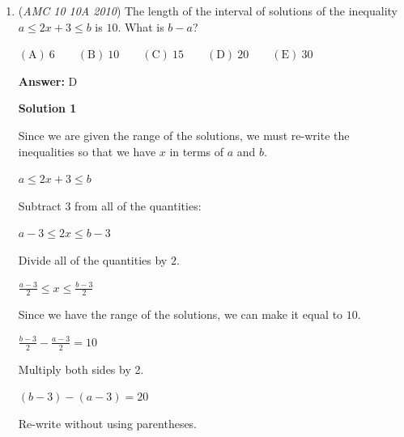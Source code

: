 \begin{enumerate}
 For example:

 $5/27/08$	Tue

 $5/27/09$	Wed

 $5/27/10$	Thur

 $5/27/11$	Fri

 However, 2012 is a leap year and has $366$ days, and $366 = 52 \cdot 7 + 2$ . This means we move "forward" \textbf{two} days in 2012, and skip past Saturday and straight to Sunday.

 Therefore:$5/27/11$	Fri

 $5/27/12$	Sun

 You can keep counting forward to find that the first time this date falls on a Saturday is in $2017$:

 $5/27/13$	Mon

 $5/27/14$	Tue

 $5/27/15$	Wed

 $5/27/16$	Fri

 $5/27/17$	Sat

 $\boxed{(E) 2017}$



	\item (\textit{AMC 10 10A 2010}) The length of the interval of solutions of the inequality $a \le 2x + 3 \le b$ is $10$. What is $b - a$?


 $\mathrm{(A)}\ 6 \qquad \mathrm{(B)}\ 10 \qquad \mathrm{(C)}\ 15 \qquad \mathrm{(D)}\ 20 \qquad \mathrm{(E)}\ 30$

 \textbf{Answer: }D



\textbf{Solution 1}

Since we are given the range of the solutions, we must re-write the inequalities so that we have $x$ in terms of $a$ and $b$. 

 $a\le 2x+3\le b$

 Subtract $3$ from all of the quantities:

 $a-3\le 2x\le b-3$

 Divide all of the quantities by $2$.

 $\frac{a-3}{2}\le x\le \frac{b-3}{2}$

 Since we have the range of the solutions, we can make it equal to $10$.

 $\frac{b-3}{2}-\frac{a-3}{2} = 10$

 Multiply both sides by 2.

 $(b-3) - (a-3) = 20$

 Re-write without using parentheses.


\end{enumerate}
